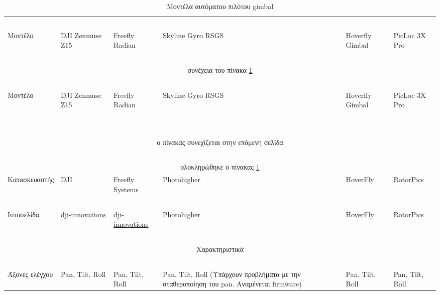 \documentclass[a4paper, 12pt, twoside]{report}
\begin{document}
{{{{{{			\begin{landscape}	
			\setlength\LTleft{0pt}            %
			\setlength\LTright{0pt}           %
	
			\begin{longtable} { m{3cm} m{3cm} m{3cm} m{3cm} m{3cm} m{3cm} }
					\caption [Μοντέλα αυτόματου πιλότου gimbal]{Μοντέλα αυτόματου πιλότου gimbal}
					\label{πιν.:Μοντέλα αυτόματου πιλότου gimbal}\\
					\hline
					~\\
					Μοντέλο & DJI Zenmuse Z15 & Freefly Radian & Skyline Gyro RSGS & Hoverfly Gimbal & PicLoc 3X Pro\\
					\hline
					~\\
					\endfirsthead
					\multicolumn{6}{c}{συνέχεια του πίνακα \ref{πιν.:Μοντέλα αυτόματου πιλότου gimbal}}\\
					~\\
					Μοντέλο & DJI Zenmuse Z15 & Freefly Radian & Skyline Gyro RSGS & Hoverfly Gimbal & PicLoc 3X Pro\\
					\hline
					~\\
					\endhead
					~\\
					\multicolumn{6}{c}{ο πίνακας συνεχίζεται στην επόμενη σελίδα}\\
					\endfoot
					~\\
					\multicolumn{6}{c}{ολοκληρώθηκε ο πίνακας \ref{πιν.:Μοντέλα αυτόματου πιλότου gimbal}}\\
					\endlastfoot
					Κατασκευαστής & DJI & Freefly Systems & Photohigher & HoverFly & RotorPics\\
					~\\
					Ιστοσελίδα & \href{http://www.dji-innovations.com/products/zenmuse-z15/overview/}{dji-innovations} & \href{http://www.freeflysystems.com/products/freefly-radian.php}{dji-innovations} & \href{http://photohigher.co.nz/products/flight-and-gimbal-control-systems/skyline-gyro-rsgs/}{Photohigher} & \href{http://www.hoverflytech.com/gimbal_1WNK.html}{HoverFly} & \href{http://www.rotorpics.com/}{RotorPics}\\
					\hline
					~\\
					\multicolumn{6}{c}{Χαρακτηριστικά}\\
					\hdashline
					~\\
					Άξονες ελέγχου & Pan, Tilt, Roll & Pan, Tilt, Roll & Pan, Tilt, Roll (Υπάρχουν προβλήματα με την σταθεροποίηση του pan. Αναμένεται firmware) & Pan, Tilt, Roll & Pan, Tilt, Roll\\

\end{longtable}
\end{landscape}}}}}}}
\end{document}
